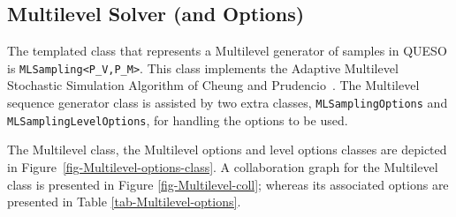 \subsection{Multilevel Solver (and Options)}\label{sec:ML}


The templated class that represents a Multilevel generator of samples in QUESO is \linebreak \verb+MLSampling<P_V,P_M>+. This class implements the Adaptive Multilevel Stochastic Simulation Algorithm of Cheung and Prudencio~\cite{CheungPrudencio2012}.
The Multilevel sequence generator class is assisted by two extra classes, \verb+MLSamplingOptions+ and \verb+MLSamplingLevelOptions+, for handling the options to be used.

The Multilevel class, the Multilevel options and level options classes are depicted in Figure~\ref{fig-Multilevel-options-class}.  A collaboration graph for the Multilevel class is presented in Figure \ref{fig-Multilevel-coll}; whereas its associated options are presented in Table \ref{tab-Multilevel-options}.
% 


